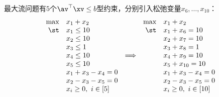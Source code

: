 \documentclass{ctexart}
\begin{document}
\begin{example}[用修正单纯形法求最大流问题] \label{exam: flow-simplex-modified}

    最大流问题有$5$个$\av^\top \xv \le b$型约束，分别引入松弛变量$x_6, \ldots, x_{10}$：
    \begin{align*}
        \begin{array}{rlcrl}
            \max & x_1 + x_2              &                 & \max & x_1 + x_2               \\
            \st  & x_1 \le 10             &                 & \st  & x_1 + x_6 = 10          \\
                 & x_2 \le 10             &                 &      & x_2 + x_7 = 10          \\
                 & x_3 \le 1              &                 &      & x_3 + x_8 = 1           \\
                 & x_4 \le 10             & \Longrightarrow &      & x_4 + x_9 = 10          \\
                 & x_5 \le 10             &                 &      & x_5 + x_{10} = 10       \\
                 & x_1 + x_3 - x_4 = 0    &                 &      & x_1 + x_3 - x_4 = 0     \\
                 & x_2 - x_3 - x_5 = 0    &                 &      & x_2 - x_3 - x_5 = 0     \\
                 & x_i \ge 0, ~ i \in [5] &                 &      & x_i \ge 0, ~ i \in [10]
        \end{array}
    \end{align*}


\end{example}
\end{document}
